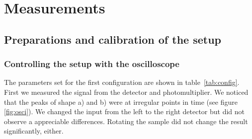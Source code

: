 \section{Measurements}
\label{sec:measurements}

\subsection{Preparations and calibration of the setup}
\label{sub:preparations_and_calibration_of_the_setup}
\subsubsection{Controlling the setup with the oscilloscope}
\label{ssub:Controlling the setup with the oscilloscope}
The parameters set for the first configuration are shown in table~\ref{tab:config}. 
First we measured the signal from the detector and photomultiplier. We noticed
that the peaks of shape a) and b) were at irregular points in time (see figure \ref{fig:osci}). 
We changed the input from the left to the right detector but did not observe a appreciable differences.
Rotating the sample did not change the result significantly, either. 
\\
\\
